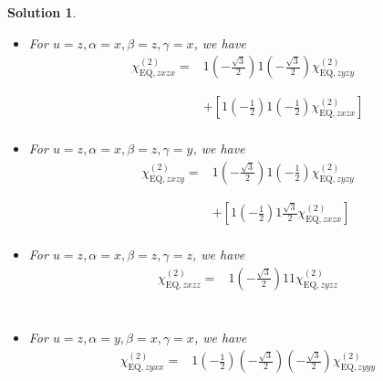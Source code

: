 \documentclass[UTF8,10pt,a4paper]{article}
\theoremstyle{Problem}
\theoremstyle{Solution}
\newtheorem*{sol}{Solution}
\begin{document}
\begin{sol}
\begin{itemize}
\footnotesize\begin{align}
\nonumber\chi_{\text{EQ},zxyz}^{(2)}=&1\left(-\frac{\sqrt{3}}{2}\right)\left(-\frac{1}{2}\right)1\chi_{\text{EQ},zyyz}^{(2)}\\
\nonumber&\\
\nonumber&+\left[1\left(-\frac{1}{2}\right)\frac{\sqrt{3}}{2}1\chi_{\text{EQ},zxxz}^{(2)}\right]\\
\nonumber&\\
&
\end{align}\normalsize
\item For $u=z,\alpha=x,\beta=z,\gamma=x$, we have
\footnotesize\begin{align}
\nonumber\chi_{\text{EQ},zxzx}^{(2)}=&1\left(-\frac{\sqrt{3}}{2}\right)1\left(-\frac{\sqrt{3}}{2}\right)\chi_{\text{EQ},zyzy}^{(2)}\\
\nonumber&\\
\nonumber&\\
\nonumber&+\left[1\left(-\frac{1}{2}\right)1\left(-\frac{1}{2}\right)\chi_{\text{EQ},zxzx}^{(2)}\right]\\
&
\end{align}\normalsize
\item For $u=z,\alpha=x,\beta=z,\gamma=y$, we have
\footnotesize\begin{align}
\nonumber\chi_{\text{EQ},zxzy}^{(2)}=&1\left(-\frac{\sqrt{3}}{2}\right)1\left(-\frac{1}{2}\right)\chi_{\text{EQ},zyzy}^{(2)}\\
\nonumber&\\
\nonumber&\\
\nonumber&+\left[1\left(-\frac{1}{2}\right)1\frac{\sqrt{3}}{2}\chi_{\text{EQ},zxzx}^{(2)}\right]\\
&
\end{align}\normalsize
\item For $u=z,\alpha=x,\beta=z,\gamma=z$, we have
\footnotesize\begin{align}
\nonumber\chi_{\text{EQ},zxzz}^{(2)}=&1\left(-\frac{\sqrt{3}}{2}\right)11\chi_{\text{EQ},zyzz}^{(2)}\\
\nonumber&\\
\nonumber&\\
\nonumber&\\
&
\end{align}\normalsize
\item For $u=z,\alpha=y,\beta=x,\gamma=x$, we have
\footnotesize\begin{align}
\nonumber\chi_{\text{EQ},zyxx}^{(2)}=&1\left(-\frac{1}{2}\right)\left(-\frac{\sqrt{3}}{2}\right)\left(-\frac{\sqrt{3}}{2}\right)\chi_{\text{EQ},zyyy}^{(2)}\\

\end{align}
\end{itemize}
\end{sol}
\end{document}
